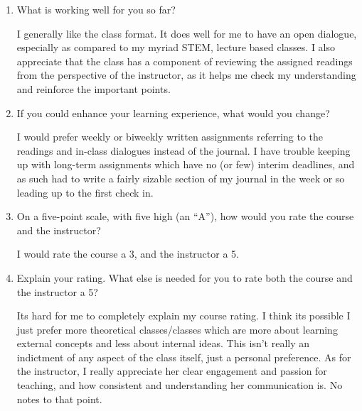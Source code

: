 \documentclass[12pt,stu,biblatex]{apa7}
\begin{document}
\begin{enumerate}
  \item What is working well for you so far?

        I generally like the class format.
        It does well for me to have an open dialogue, especially as compared to my myriad STEM, lecture based classes.
        I also appreciate that the class has a component of reviewing the assigned readings from the perspective of the instructor, as it helps me check my understanding and reinforce the important points.

  \item If you could enhance your learning experience, what would you change?

        I would prefer weekly or biweekly written assignments referring to the readings and in-class dialogues instead of the journal.
        I have trouble keeping up with long-term assignments which have no (or few) interim deadlines, and as such had to write a fairly sizable section of my journal in the week or so leading up to the first check in.

  \item On a five-point scale, with five high (an ``A''), how would you rate the course and the instructor?

        I would rate the course a 3, and the instructor a 5.

  \item Explain your rating. What else is needed for you to rate both the course and the instructor a 5?

        Its hard for me to completely explain my course rating.
        I think its possible I just prefer more theoretical classes/classes which are more about learning external concepts and less about internal ideas.
        This isn't really an indictment of any aspect of the class itself, just a personal preference.
        As for the instructor, I really appreciate her clear engagement and passion for teaching, and how consistent and understanding her communication is.
        No notes to that point.

\end{enumerate}
\end{document}

